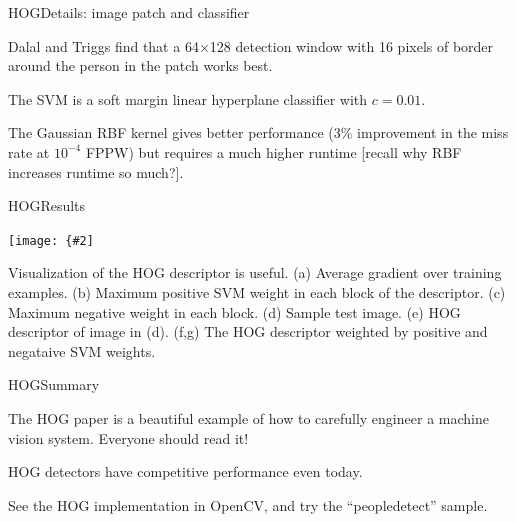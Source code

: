 \documentclass[aspectratio=169]{beamer}
\newcommand{\myfig}[3]{\centerline{\texttt{[image: \{\#2]}}}
\begin{document}
\begin{frame}{HOG}{Details: image patch and classifier}

  Dalal and Triggs find that a 64$\times$128 detection window with 16 pixels of border around the person in the patch works best.

  \medskip

  The SVM is a soft margin linear hyperplane classifier with $c = 0.01$.

  \medskip

  The Gaussian RBF kernel gives better performance (3\% improvement in
  the miss rate at $10^{-4}$ FPPW) but requires a much higher runtime
  [recall why RBF increases runtime so much?].
  
\end{frame}


\begin{frame}{HOG}{Results}

  \myfig{4.5in}{dalal-fig6}{Dalal and Triggs (2005), Fig.\ 6}

  \medskip

  Visualization of the HOG descriptor is useful. (a) Average gradient
  over training examples. (b) Maximum positive SVM weight in each
  block of the descriptor. (c) Maximum negative weight in each
  block. (d) Sample test image. (e) HOG descriptor of image in
  (d). (f,g) The HOG descriptor weighted by positive and negataive SVM
  weights.
  
\end{frame}


\begin{frame}{HOG}{Summary}

  The HOG paper is a beautiful example of how to carefully engineer a
  machine vision system. Everyone should read it!

  \medskip

  HOG detectors have competitive performance even today.

  \medskip

  See the HOG implementation in OpenCV, and try the ``peopledetect''
  sample.

\end{frame}
\end{document}
